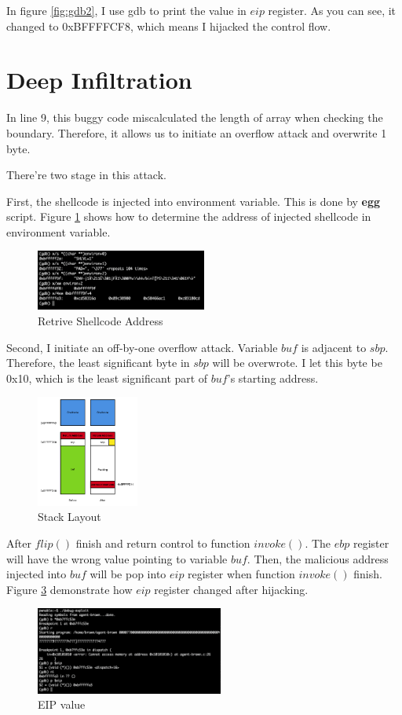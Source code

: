 \documentclass{article}
\begin{document}
In figure \ref{fig:gdb2}, I use gdb to print the value in $eip$ register. As you can see, it changed to 0xBFFFFCF8, which means I hijacked the control flow.

\newpage
\section{Deep Infiltration}

In line 9, this buggy code miscalculated the length of array when checking the boundary. Therefore, it allows us to initiate an overflow attack and overwrite 1 byte.

There're two stage in this attack. 

First, the shellcode is injected into environment variable. This is done by \textbf{egg} script.  Figure \ref{fig:gdb3} shows how to determine the address of injected shellcode in environment variable.

\begin{figure}[h]
\centering
\includegraphics[width=0.5\textwidth]{gdb3.png}
\caption{\label{fig:gdb3}Retrive Shellcode Address}
\end{figure}

Second, I initiate an off-by-one overflow attack. Variable $buf$ is adjacent to $sbp$. Therefore, the least significant byte in $sbp$ will be overwrote. I let this byte be 0x10, which is the least significant part of $buf$'s starting address.

 \begin{figure}[h]
\centering
\includegraphics[width=0.3\textwidth]{stack3.png}
\caption{\label{fig:stack3}Stack Layout}
\end{figure}

After $flip()$ finish and return control to function $invoke()$. The $ebp$ register will have the wrong value pointing to variable $buf$. Then, the malicious address injected into $buf$ will be pop into $eip$ register when function $invoke()$ finish. Figure \ref{fig:gdb4} demonstrate how $eip$ register changed after hijacking.

\begin{figure}[h]
\centering
\includegraphics[width=0.55\textwidth]{gdb4.png}
\caption{\label{fig:gdb4}EIP value}
\end{figure}
\end{document}
